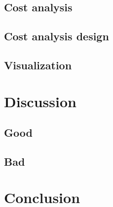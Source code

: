 \documentclass [12pt]{article}
\begin{document}
\subsection{Cost analysis}
\subsection{Cost analysis design}
\subsection{Visualization}
\section{Discussion}
\subsection{Good}
\subsection{Bad}
\section{Conclusion}


\end{document}
